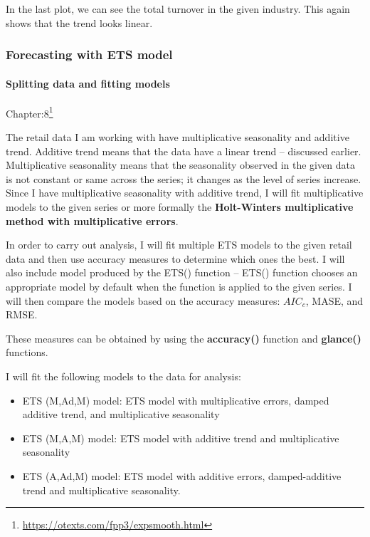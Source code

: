 \documentclass[
]{article}
\providecommand{\tightlist}{%
  \setlength{\itemsep}{0pt}\setlength{\parskip}{0pt}}
\begin{document}
In the last plot, we can see the total turnover in the given industry.
This again shows that the trend looks linear.

\hypertarget{forecasting-with-ets-model}{%
\subsubsection{Forecasting with ETS
model}\label{forecasting-with-ets-model}}

\hypertarget{splitting-data-and-fitting-models}{%
\paragraph{Splitting data and fitting
models}\label{splitting-data-and-fitting-models}}

Chapter:8\footnote{\url{https://otexts.com/fpp3/expsmooth.html}}

The retail data I am working with have multiplicative seasonality and
additive trend. Additive trend means that the data have a linear trend
-- discussed earlier. Multiplicative seasonality means that the
seasonality observed in the given data is not constant or same across
the series; it changes as the level of series increase. Since I have
multiplicative seasonality with additive trend, I will fit
multiplicative models to the given series or more formally the
\textbf{Holt-Winters multiplicative method with multiplicative errors}.

In order to carry out analysis, I will fit multiple ETS models to the
given retail data and then use accuracy measures to determine which ones
the best. I will also include model produced by the ETS() function --
ETS() function chooses an appropriate model by default when the function
is applied to the given series. I will then compare the models based on
the accuracy measures: \(AIC_c\), MASE, and RMSE.

These measures can be obtained by using the \textbf{accuracy()} function
and \textbf{glance()} functions.

I will fit the following models to the data for analysis:

\begin{itemize}
\tightlist
\item
  ETS (M,Ad,M) model: ETS model with multiplicative errors, damped
  additive trend, and multiplicative seasonality
\item
  ETS (M,A,M) model: ETS model with additive trend and multiplicative
  seasonality
\item
  ETS (A,Ad,M) model: ETS model with additive errors, damped-additive
  trend and multiplicative seasonality.
\end{itemize}
\end{document}
